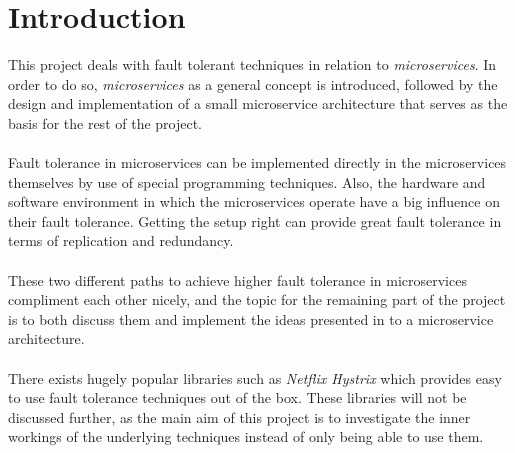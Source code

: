 \section{Introduction}
This project deals with fault tolerant techniques in relation to
\textit{microservices}. In order to do so, \textit{microservices} as a
general concept is introduced, followed by the design and
implementation of a small microservice architecture that serves as the
basis for the rest of the project.
\\\\
Fault tolerance in microservices can be implemented directly in the
microservices themselves by use of special programming
techniques. Also, the hardware and software environment in which the
microservices operate have a big influence on their fault
tolerance. Getting the setup right can provide great fault tolerance
in terms of replication and redundancy.
\\\\
These two different paths to achieve higher fault tolerance in
microservices compliment each other nicely, and the topic for the
remaining part of the project is to both discuss them and implement
the ideas presented in to a microservice architecture.
\\\\
There exists hugely popular libraries such as \textit{Netflix Hystrix}
which provides easy to use fault tolerance techniques out of the
box. These libraries will not be discussed further, as the main aim of
this project is to investigate the inner workings of the underlying
techniques instead of only being able to use them.
